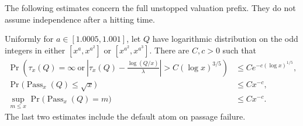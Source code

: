 The following estimates concern the full unstopped valuation prefix.
They do not assume independence after a hitting time.

\begin{lemma}\label{lem:ct-local}
Uniformly for \(a\in[1.0005,1.001]\), let \(Q\) have logarithmic
distribution on the odd integers in either
\([x^a,x^{a^2}]\) or \([x^{a^2},x^{a^3}]\).
There are \(C,c>0\) such that
\begin{align}
 \Pr\!\left(\tau_x(Q)=\infty\ \text{or}\
 \left|\tau_x(Q)-\frac{\log(Q/x)}{\lambda}\right|
       >C(\log x)^{3/5}\right)
 &\le C e^{-c(\log x)^{1/5}},\label{eq:ct-local-time}\\
 \Pr\bigl(\operatorname{Pass}_x(Q)\le\sqrt x\bigr)
 &\le Cx^{-c},\label{eq:ct-small-landing}\\
 \sup_{m\le x}\Pr\bigl(\operatorname{Pass}_x(Q)=m\bigr)
 &\le Cx^{-c}.\label{eq:ct-local-atoms}
\end{align}
The last two estimates include the default atom on passage failure.
\end{lemma}
